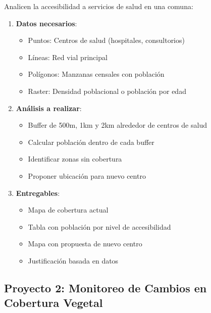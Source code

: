\documentclass[11pt,a4paper]{article}
\newcommand{\ejercicio}[1]{\begin{tcolorbox}[colback=red!5,colframe=red,title={Ejercicio}]#1\end{tcolorbox}}
\begin{document}
\ejercicio{
Analicen la accesibilidad a servicios de salud en una comuna:

\begin{enumerate}
    \item \textbf{Datos necesarios}:
    \begin{itemize}
        \item Puntos: Centros de salud (hospitales, consultorios)
        \item Líneas: Red vial principal
        \item Polígonos: Manzanas censales con población
        \item Raster: Densidad poblacional o población por edad
    \end{itemize}
    
    \item \textbf{Análisis a realizar}:
    \begin{itemize}
        \item Buffer de 500m, 1km y 2km alrededor de centros de salud
        \item Calcular población dentro de cada buffer
        \item Identificar zonas sin cobertura
        \item Proponer ubicación para nuevo centro
    \end{itemize}
    
    \item \textbf{Entregables}:
    \begin{itemize}
        \item Mapa de cobertura actual
        \item Tabla con población por nivel de accesibilidad
        \item Mapa con propuesta de nuevo centro
        \item Justificación basada en datos
    \end{itemize}
\end{enumerate}
}

\subsection{Proyecto 2: Monitoreo de Cambios en Cobertura Vegetal}
\end{document}
